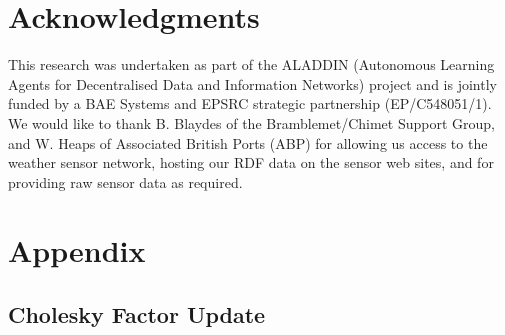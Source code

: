 \documentclass{acmtrans2m}
\begin{document}
\section*{Acknowledgments}

\noindent This research was undertaken as part of the ALADDIN (Autonomous Learning Agents for Decentralised Data and Information Networks) project and is jointly funded by a BAE Systems and EPSRC strategic partnership (EP/C548051/1). We would like to thank B. Blaydes of the Bramblemet/Chimet Support Group, and W. Heaps of Associated British Ports (ABP) for allowing us access to the weather sensor network, hosting our RDF data on the sensor web sites, and for providing raw sensor data as required.


  



\appendix

\section{Appendix} \label{sec:Appendix}

\subsection{Cholesky Factor Update} \label{sec:CholeskyUpdate}

\small
\end{document}
